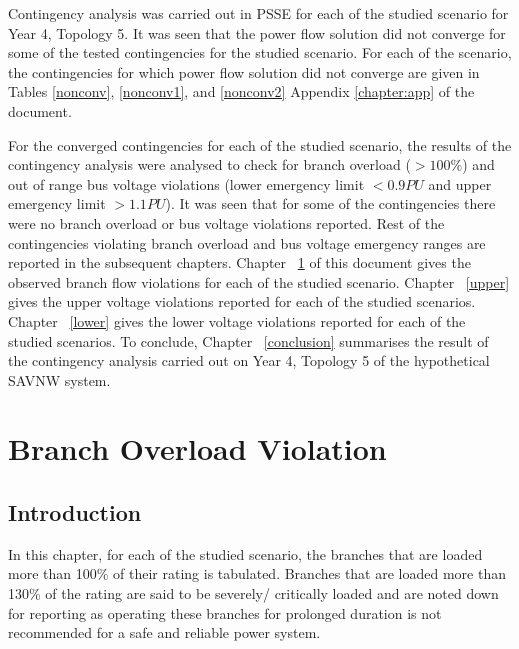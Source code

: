\documentclass[10pt]{report}
\begin{document}
Contingency analysis was carried out in PSSE for each of the studied scenario for Year 4, Topology 5. It was seen that the power flow solution did not converge for some of the tested contingencies for the studied scenario. 
For each of the scenario, the contingencies for which power flow solution did not converge are given in Tables \ref{nonconv}, \ref{nonconv1}, and \ref{nonconv2} Appendix \ref{chapter:app} of the document. 

For the converged contingencies for each of the studied scenario, the results of the contingency analysis were analysed to check for branch overload ($ > 100\%$) and out of range bus voltage violations (lower emergency limit $ < 0.9 PU $ and upper emergency limit $ > 1.1 PU$). It was seen that for some of the contingencies there were no branch overload or bus voltage violations reported. Rest of the contingencies violating branch overload and bus voltage emergency ranges are reported in the subsequent chapters. Chapter ~\ref{overload} of this document gives the observed branch flow violations for each of the studied scenario. Chapter ~\ref{upper} gives the upper voltage violations reported for each of the studied scenarios. Chapter ~\ref{lower} gives the lower voltage violations reported for each of the studied scenarios. To conclude, Chapter ~\ref{conclusion} summarises the result of the contingency analysis carried out on Year 4, Topology 5 of the hypothetical SAVNW system. 



\chapter{Branch Overload Violation}
\label{overload}
\section{Introduction}
In this chapter, for each of the studied scenario, the branches that are loaded more than 100\% of their rating is tabulated. Branches that are loaded more than 130\% of the rating are said to be severely/ critically loaded and are noted down for reporting as operating these branches for prolonged duration is not recommended for a safe and reliable power system.
\end{document}
